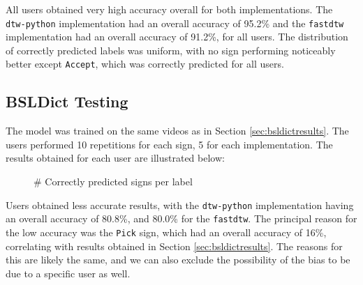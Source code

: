 \documentclass[final,rdr32.tex]{subfiles}
\begin{document}
All users obtained very high accuracy overall for both implementations. The \\ \verb|dtw-python| implementation had an overall accuracy of 95.2\% and the \verb|fastdtw| implementation had an overall accuracy of 91.2\%, for all users. The distribution of correctly predicted labels was uniform, with no sign performing noticeably better except \verb|Accept|, which was correctly predicted for all users.

\subsection{BSLDict Testing}

The model was trained on the same videos as in Section \ref{sec:bsldictresults}. The users performed 10 repetitions for each sign, 5 for each implementation. The results obtained for each user are illustrated below:

\begin{figure}[H]
    \begin{center}
    \end{center}
    \caption{\# Correctly predicted signs per label}
    \label{bar:bsldictuser}
\end{figure}

Users obtained less accurate results, with the \verb|dtw-python| implementation having an overall accuracy of 80.8\%, and 80.0\% for the \verb|fastdtw|. The principal reason for the low accuracy was the \verb|Pick| sign, which had an overall accuracy of 16\%, correlating with results obtained in Section \ref{sec:bsldictresults}. The reasons for this are likely the same, and we can also exclude the possibility of the bias to be due to a specific user as well.
\end{document}
